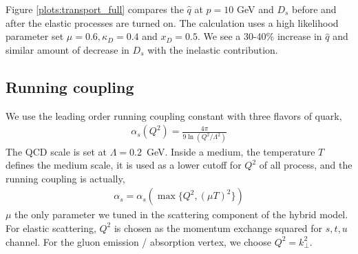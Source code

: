 \documentclass[aps, prc, reprint, amsmath, groupedaddress, nofootinbib]{revtex4-1}
\begin{document}
Figure \ref{plots:transport_full} compares the $\hat{q}$ at $p=10$ GeV and $D_s$ before and after the elastic processes are turned on.
The calculation uses a high likelihood parameter set $\mu = 0.6, \kappa_D = 0.4$ and $x_D = 0.5$. 
We see a 30-40\% increase in $\hat{q}$ and similar amount of decrease in $D_s$ with the inelastic contribution.
\begin{appendices}
\section{Running coupling}
We use the leading order running coupling constant with three flavors of quark,
\begin{eqnarray}
\alpha_s(Q^2) = \frac{4\pi}{9 \ln\left(Q^2/\Lambda^2\right) }
\end{eqnarray}
The QCD scale is set at $\Lambda = 0.2$~GeV.
Inside a medium, the temperature $T$ defines the medium scale, it is used as a lower cutoff for $Q^2$ of all process, and the running coupling is actually,
\begin{eqnarray}
\alpha_s = \alpha_s(\max\{Q^2,(\mu T)^2\})
\end{eqnarray}
$\mu$ the only parameter we tuned in the scattering component of the hybrid model.
For elastic scattering, $Q^2$ is chosen as the momentum exchange squared for $s,t,u$ channel.
For the gluon emission / absorption vertex, we choose $Q^2 = k_\perp^2$.


\end{appendices}
\end{document}

